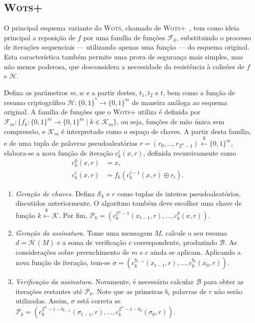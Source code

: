 \documentclass[12pt]{report}
\newcommand{\hh}{\mathcal{H}}
\newcommand{\pk}{\mathcal{P}_k}
\newcommand{\sk}{\mathcal{S}_k}
\newcommand{\hash}[2][]{\mathcal{H}^{#1}(#2)}
\newcommand{\binwds}[1]{\{0, 1\}^{#1}}
\newcommand{\fhash}[1]{\hh{} : \binwds{*} \longrightarrow \binwds{#1}}
\begin{document}
\subsection{\textsc{Wots+}}

O principal esquema variante do \textsc{Wots}, chamado de
\textsc{Wots+}~\cite{Hlsing2013}, tem como ideia principal a
reposição de $f$ por uma família de funções $\mathcal{F}_k$, substituindo o
processo de iterações sequenciais --- utilizando apenas uma função --- do
esquema original. Esta característica também permite uma prova de segurança
mais simples, mas não menos poderosa, que desconsidera a necessidade da
resistência à colisões de $f$ e $\hh{}$.

Defina os parâmetros $m, w$ e a partir destes, $t_1, t_2 \text{ e } t$, bem
como a função de resumo criptográfico $\fhash{m}$ de maneira análoga ao esquema
original. A família de funções que o \textsc{Wots+} utiliza é definida por
$\mathcal{F}_m : \{f_k : \binwds{m} \longrightarrow \binwds{m} \mid k \in
\mathcal{K}_m\}$, ou seja, funções de mão única sem compressão, e
$\mathcal{K}_m$ é interpretado como o espaço de chaves. A partir desta família,
e de uma tupla de palavras pseudoaleatórias $r = (r_0, \dots, r_{2^w - 1})
\stackrel{\$}{\longleftarrow} \binwds{m}$, elabora-se a nova função de iteração
$c^{i}_{k}(x, r)$, definida recursivamente como
\begin{equation}
  \begin{split}
    c^{0}_{k}(x, r) &= x, \\
    c^{i}_{k}(x, r) &= f_k(c^{i-1}_{k}(x, r) \oplus r_i).
  \end{split}
\end{equation}

\begin{enumerate}

  \item[] \emph{Geração de chaves.} Defina $\sk{}$ e $r$ como tuplas de
      inteiros pseudoaleatórios, discutidos anteriormente. O algoritmo também
        deve escolher uma chave de função $k \stackrel{\$}\longleftarrow
        \mathcal{K}$. Por fim, $\pk{} = (c^{2^w-1}_{k}(x_{t-1}, r), \dots,
        c^{0}_{k}(x, r))$.

  \item[] \emph{Geração da assinatura.} Tome uma mensagem $M$, calcule o seu
      resumo $d = \hash{M}$ e a soma de verificação $c$ correspondente,
        produzindo $\mathcal{B}$. As considerações sobre preenchimento de $m$ e
        $c$ ainda se aplicam. Aplicando a nova função de iteração, tem-se
        $\sigma = (c^{b_{t - 1}}_{k}(x_{t-1}, r), \dots, c^{b_{0}}_{k}(x_{0},
        r))$.

  \item[] \emph{Verificação da assinatura.} Novamente, é necessário calcular
      $\mathcal{B}$ para obter as iterações restantes até $\pk{}$. Note que as
        primeiras $b_i$ palavras de $r$ não serão utilizadas. Assim, $\sigma$
        está correta se $\pk{} = (c^{2^{w} - 1 - b_{t - 1}}_{k}(\sigma_{t-1},
        r), \dots, c^{2^{w} - 1 - b_{0}}_{k}(\sigma_{0}, r))$.

\end{enumerate}
\end{document}

